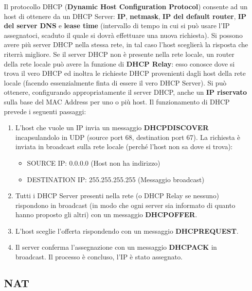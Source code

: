\documentclass[12pt]{article}
\begin{document}
Il protocollo DHCP (\textbf{Dynamic Host Configuration Protocol}) consente ad un host di ottenere da un DHCP Server: \textbf{IP}, \textbf{netmask}, \textbf{IP del default router}, \textbf{IP del server DNS} e \textbf{lease time} (intervallo di tempo in cui si può usare l'IP assegnatoci, scaduto il quale si dovrà effettuare una nuova richiesta). Si possono avere più server DHCP nella stessa rete, in tal caso l'host sceglierà la risposta che riterrà migliore. Se il server DHCP non è presente nella rete locale, un router della rete locale può avere la funzione di \textbf{DHCP Relay}: esso conosce dove si trova il vero DHCP ed inoltra le richieste DHCP provenienti dagli host della rete locale (facendo essenzialmente finta di essere il vero DHCP Server). Si può ottenere, configurando appropriatamente il server DHCP, anche un \textbf{IP riservato} sulla base del MAC Address per uno o più host. Il funzionamento di DHCP prevede i seguenti passaggi:
\begin{enumerate}
    \item L'host che vuole un IP invia un messaggio \textbf{DHCPDISCOVER} incapsulandolo in UDP (source port 68, destination port 67). La richiesta è inviata in broadcast sulla rete locale (perché l'host non sa dove si trova):
    \begin{itemize}
        \item SOURCE IP: 0.0.0.0 (Host non ha indirizzo)
        \item DESTINATION IP: 255.255.255.255 (Messaggio broadcast)
    \end{itemize}
    \item Tutti i DHCP Server presenti nella rete (o DHCP Relay se nessuno) rispondono in broadcast (in modo che ogni server sia informato di quanto hanno proposto gli altri) con un messaggio \textbf{DHCPOFFER}.
    \item L'host sceglie l'offerta rispondendo con un messaggio \textbf{DHCPREQUEST}.
    \item Il server conferma l'assegnazione con un messaggio \textbf{DHCPACK} in broadcast. Il processo è concluso, l'IP è stato assegnato.
\end{enumerate}

\subsection{NAT}
\end{document}
